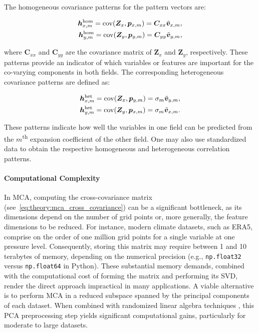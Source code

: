 The homogeneous covariance patterns \cite{bretherton_intercomparison_1992} for the pattern vectors are:

\begin{subequations}
    \begin{align}
        \bm{h}_{x, m}^{\text{hom}} = \operatorname{cov}(\bm{Z}_x, \bm{p}_{x,m}) = \bm{C}_{xx} \tilde{\bm{v}}_{x,m},\\
        \bm{h}_{y, m}^{\text{hom}} = \operatorname{cov}(\bm{Z}_y, \bm{p}_{y,m}) = \bm{C}_{yy} \tilde{\bm{v}}_{y,m},
    \end{align}
\end{subequations}

where $\bm{C}_{xx}$ and $\bm{C}_{yy}$ are the covariance matrix of $\bm{Z}_x$ and $\bm{Z}_y$, respectively. These patterns provide an indicator of which variables or features are important for the co-varying components in both fields. The corresponding heterogeneous covariance patterns are defined as:

\begin{subequations}
    \begin{align}\label{eq:theory:mca_heterogeneous_patterns}
        \bm{h}_{x,m}^{\text{het}} = \operatorname{cov}(\bm{Z}_x, \bm{p}_{y,m}) = \sigma_m \tilde{\bm{v}}_{y,m},\\
        \bm{h}_{y,m}^{\text{het}} = \operatorname{cov}(\bm{Z}_y, \bm{p}_{x,m}) = \sigma_m \tilde{\bm{v}}_{x,m}.
    \end{align}
\end{subequations}

These patterns indicate how well the variables in one field can be predicted from the $m$\textsuperscript{th} expansion coefficient of the other field. One may also use standardized data to obtain the respective homogeneous and heterogeneous correlation patterns.


\paragraph{Computational Complexity} In MCA, computing the cross-covariance matrix (see~\eqref{eq:theory:mca_cross_covariance}) can be a significant bottleneck, as its dimensions depend on the number of grid points or, more generally, the feature dimensions to be reduced. For instance, modern climate datasets, such as ERA5, comprise on the order of one million grid points for a single variable at one pressure level. Consequently, storing this matrix may require between 1 and 10 terabytes of memory, depending on the numerical precision (e.g., \texttt{np.float32} versus \texttt{np.float64} in Python). These substantial memory demands, combined with the computational  cost of forming the matrix and performing its SVD, render the direct approach impractical in many applications. A viable alternative is to perform MCA in a reduced subspace spanned by the principal components of each dataset. When combined with randomized linear algebra techniques \cite{halko_finding_2011}, this PCA preprocessing step yields significant computational gains, particularly for moderate to large datasets.

